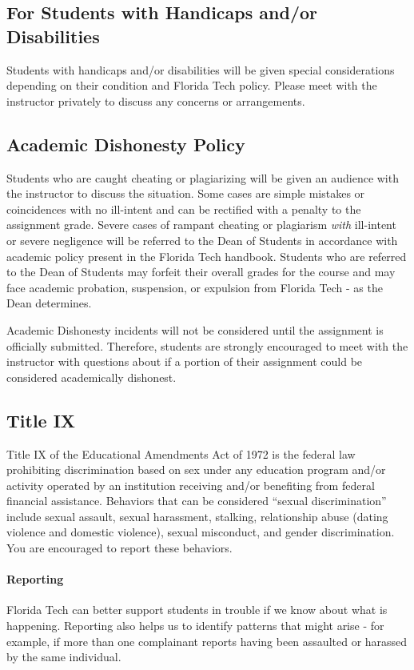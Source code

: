    \subsection*{For Students with Handicaps and/or Disabilities}
    Students with handicaps and/or disabilities will be given special considerations depending on their condition and Florida Tech policy. Please meet with the instructor privately to discuss any concerns or arrangements. 

    \subsection*{Academic Dishonesty Policy}
    Students who are caught cheating or plagiarizing will be given an audience with the instructor to discuss the situation. 
    Some cases are simple mistakes or coincidences with no ill-intent and can be rectified with a penalty to the assignment grade.
    Severe cases of rampant cheating or plagiarism \emph{with} ill-intent or severe negligence will be referred to the Dean of Students in accordance with academic policy present in the Florida Tech handbook.
    Students who are referred to the Dean of Students may forfeit their overall grades for the course and may face academic probation, suspension, or expulsion from Florida Tech - as the Dean determines.
    
    Academic Dishonesty incidents will not be considered until the assignment is officially submitted. 
    Therefore, students are strongly encouraged to meet with the instructor with questions about if a portion of their assignment could be considered academically dishonest.

    \subsection*{Title IX}
    Title IX of the Educational Amendments Act of 1972 is the federal law prohibiting discrimination based on sex under any education program and/or activity operated by an institution receiving and/or benefiting from federal financial assistance. Behaviors that can be considered “sexual discrimination” include sexual assault, sexual harassment, stalking, relationship abuse (dating violence and domestic violence), sexual misconduct, and gender discrimination. You are encouraged to report these behaviors. 

    \paragraph*{Reporting} Florida Tech can better support students in trouble if we know about what is happening.  Reporting also helps us to identify patterns that might arise - for example, if more than one complainant reports having been assaulted or harassed by the same individual.


